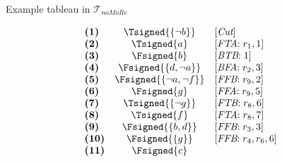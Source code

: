 \begin{frame}{Example tableau in $\mathcal{T}_{\textit{noMoRe}}$}
\TableauExampleProgram
\begin{center}
\begin{minipage}[t]{16cm}
\tiny
\begin{minipage}[t]{4.5cm}
\[
\hspace{-0.2cm}
\begin{array}{lcl}
\textbf{(1)}                                       &
  \Tsigned{\{\neg b\}}                     &
  [\textit{Cut}]                                   \\
\textbf{(2)}                                       &
  \Tsigned{a}                                      &
  [\textit{FTA}{:}\; r_1, \text{1}]                \\
\textbf{(3)}                                       &
  \Fsigned{b}                                      &
  [\textit{BTB}{:}\; \text{1}]                     \\
\textbf{(4)}                                       &
  \Fsigned{\{d,\neg a\}}                   &
  [\textit{BFA}{:}\;r_2, \text{3}]                 \\
\textbf{(5)}                                       &
  \Fsigned{\{\neg a,\neg f\}}      &
  [\textit{FFB}{:}\;r_9, \text{2}]                 \\
\textbf{(6)}                                       &
  \Fsigned{g}                                      &
  [\textit{FFA}{:}\;r_9, \text{5}]                 \\
\textbf{(7)}                                       &
  \Tsigned{\{\neg g\}}                     &
  [\textit{FTB}{:}\;r_8, \text{6}]                 \\
\textbf{(8)}                                       &
  \Tsigned{f}                                      &
  [\textit{FTA}{:}\;r_8, \text{7}]                 \\
\textbf{(9)}                                       &
  \Fsigned{\{b,d\}}                                &
  [\textit{FFB}{:}\;r_3, \text{3}]                 \\
\textbf{(10)}                                      &
  \Fsigned{\{g\}}                                  &
  [\textit{FFB}{:}\;r_4, r_6, \text{6}]            \\
\textbf{(11)}                                      &
  \Fsigned{c}                                      &

\end{array}\]
\end{minipage}
\end{minipage}
\end{center}
\end{frame}
